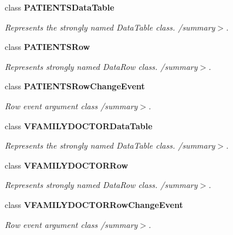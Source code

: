 \begin{CompactItemize}
class {\bf PATIENTSDataTable}
\begin{CompactList}\small\item\em Represents the strongly named DataTable class. /summary$>$. \item\end{CompactList}\item 
class {\bf PATIENTSRow}
\begin{CompactList}\small\item\em Represents strongly named DataRow class. /summary$>$. \item\end{CompactList}\item 
class {\bf PATIENTSRowChangeEvent}
\begin{CompactList}\small\item\em Row event argument class /summary$>$. \item\end{CompactList}\item 
class {\bf VFAMILYDOCTORDataTable}
\begin{CompactList}\small\item\em Represents the strongly named DataTable class. /summary$>$. \item\end{CompactList}\item 
class {\bf VFAMILYDOCTORRow}
\begin{CompactList}\small\item\em Represents strongly named DataRow class. /summary$>$. \item\end{CompactList}\item 
class {\bf VFAMILYDOCTORRowChangeEvent}
\begin{CompactList}\small\item\em Row event argument class /summary$>$. \item\end{CompactList}\end{CompactItemize}
